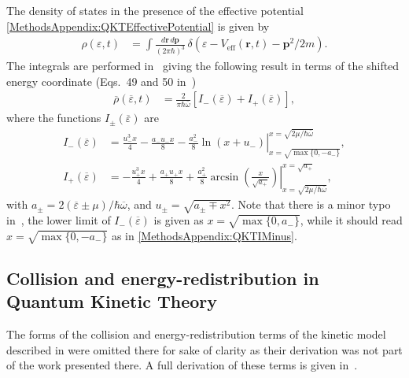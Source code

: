 The density of states in the presence of the effective potential \eqref{MethodsAppendix:QKTEffectivePotential} is given by
\begin{align}
    \rho(\varepsilon, t) &= \int \frac{d \bm{r}\, d \bm{p}}{(2\pi \hbar)^3} \,\delta\left(\varepsilon - V_\text{eff}(\bm{r}, t) - \bm{p}^2/2 m\right).
    \label{MethodsAppendix:DensityOfStatesDefinition}
\end{align}
The integrals are performed in~\citep{Bijlsma:2000} giving the following result in terms of the shifted energy coordinate (Eqs.~49 and 50 in~\citep{Bijlsma:2000})
\begin{align}
    \overline{\rho}(\overline{\varepsilon}, t) &= \frac{2}{\pi \hbar \overline{\omega}} \left[I_-(\overline{\varepsilon}) + I_+(\overline{\varepsilon})\right],
\end{align}
where the functions $I_\pm(\overline{\varepsilon})$ are
\begin{align}
    I_-(\overline{\varepsilon}) &= \left.\frac{u_-^3 x}{4} - \frac{a_- u_- x}{8} - \frac{a_-^2}{8}\ln(x + u_-)\right|_{x=\sqrt{\max\{0, -a_-\}}}^{x=\sqrt{2\mu/\hbar \overline{\omega}}}, \label{MethodsAppendix:QKTIMinus}\\
    I_+(\overline{\varepsilon}) &= \left.- \frac{u_+^3 x}{4} + \frac{a_+ u_+ x}{8} + \frac{a_+^2}{8} \arcsin\left(\frac{x}{\sqrt{a_+}}\right)\right|_{x=\sqrt{2\mu/\hbar\overline{\omega}}}^{x=\sqrt{a_+}}, \label{MethodsAppendix:QKTIPlus}
\end{align}
with $a_\pm = 2(\overline{\varepsilon}\pm \mu)/\hbar\overline{\omega}$, and $u_\pm = \sqrt{a_\pm \mp x^2}$. Note that there is a minor typo in~\citet{Bijlsma:2000}, the lower limit of $I_-(\overline{\varepsilon})$ is given as $x=\sqrt{\max\{0, a_-\}}$, while it should read $x=\sqrt{\max\{0, -a_-\}}$ as in \eqref{MethodsAppendix:QKTIMinus}.

\subsection{Collision and energy-redistribution in Quantum Kinetic Theory}
\label{MethodsAppendix:QKTOtherTerms}

The forms of the collision and energy-redistribution terms of the kinetic model described in  were omitted there for sake of clarity as their derivation was not part of the work presented there.  A full derivation of these terms is given in~\citep{Bijlsma:2000,Proukakis:2008}.

